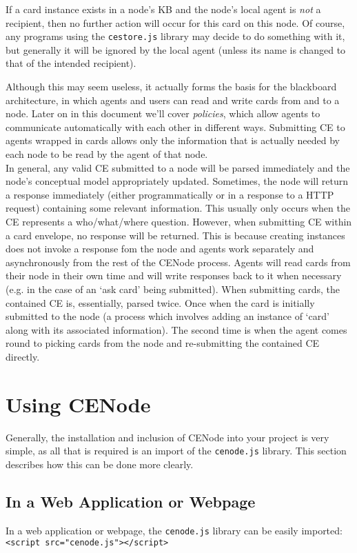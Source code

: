 \documentclass{scrartcl}
\begin{document}
If a card instance exists in a node's KB and the node's local agent is \textit{not} a recipient, then no further action will occur for this card on this node. Of course, any programs using the \texttt{cestore.js} library may decide to do something with it, but generally it will be ignored by the local agent (unless its name is changed to that of the intended recipient).

Although this may seem useless, it actually forms the basis for the blackboard architecture, in which agents and users can read and write cards from and to a node. Later on in this document we'll cover \textit{policies}, which allow agents to communicate automatically with each other in different ways. Submitting CE to agents wrapped in cards allows only the information that is actually needed by each node to be read by the agent of that node.\\

In general, any valid CE submitted to a node will be parsed immediately and the node's conceptual model appropriately updated. Sometimes, the node will return a response immediately (either programmatically or in a response to a HTTP request) containing some relevant information. This usually only occurs when the CE represents a who/what/where question. However, when submitting CE within a card envelope, no response will be returned. This is because creating instances does not invoke a response fom the node and agents work separately and asynchronously from the rest of the CENode process. Agents will read cards from their node in their own time and will write responses back to it when necessary (e.g. in the case of an `ask card' being submitted). When submitting cards, the contained CE is, essentially, parsed twice. Once when the card is initially submitted to the node (a process which involves adding an instance of `card' along with its associated information). The second time is when the agent comes round to picking cards from the node and re-submitting the contained CE directly.


\section{Using CENode}
Generally, the installation and inclusion of CENode into your project is very simple, as all that is required is an import of the \texttt{cenode.js} library. This section describes how this can be done more clearly.

\subsection{In a Web Application or Webpage}
\label{as_a_webapp}
In a web application or webpage, the \texttt{cenode.js} library can be easily imported:\\
\texttt{<script src="cenode.js"></script>}\\
\end{document}
